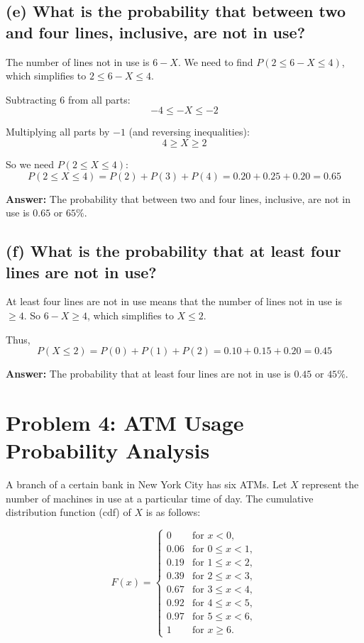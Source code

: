 \documentclass{article}
\begin{document}
\subsection*{(e) What is the probability that between two and four lines, inclusive, are not in use?}

The number of lines not in use is \(6 - X\). We need to find \(P(2 \leq 6 - X \leq 4)\), which simplifies to \(2 \leq 6 - X \leq 4\).

Subtracting 6 from all parts:
\[
-4 \leq -X \leq -2
\]

Multiplying all parts by \(-1\) (and reversing inequalities):
\[
4 \geq X \geq 2
\]

So we need \(P(2 \leq X \leq 4)\):
\[
P(2 \leq X \leq 4) = P(2) + P(3) + P(4) = 0.20 + 0.25 + 0.20 = 0.65
\]

\textbf{Answer:} The probability that between two and four lines, inclusive, are not in use is \(0.65\) or \(65\%\).

\subsection*{(f) What is the probability that at least four lines are not in use?}

At least four lines are not in use means that the number of lines not in use is \(\geq 4\). So \(6 - X \geq 4\), which simplifies to \(X \leq 2\).

Thus,
\[
P(X \leq 2) = P(0) + P(1) + P(2) = 0.10 + 0.15 + 0.20 = 0.45
\]

\textbf{Answer:} The probability that at least four lines are not in use is \(0.45\) or \(45\%\).

\section*{Problem 4: ATM Usage Probability Analysis}

A branch of a certain bank in New York City has six ATMs. Let \(X\) represent the number of machines in use at a particular time of day. The cumulative distribution function (cdf) of \(X\) is as follows:

\[
F(x) = 
\begin{cases} 
0 & \text{for } x < 0, \\
0.06 & \text{for } 0 \leq x < 1, \\
0.19 & \text{for } 1 \leq x < 2, \\
0.39 & \text{for } 2 \leq x < 3, \\
0.67 & \text{for } 3 \leq x < 4, \\
0.92 & \text{for } 4 \leq x < 5, \\
0.97 & \text{for } 5 \leq x < 6, \\
1 & \text{for } x \geq 6.
\end{cases}
\]
\end{document}
